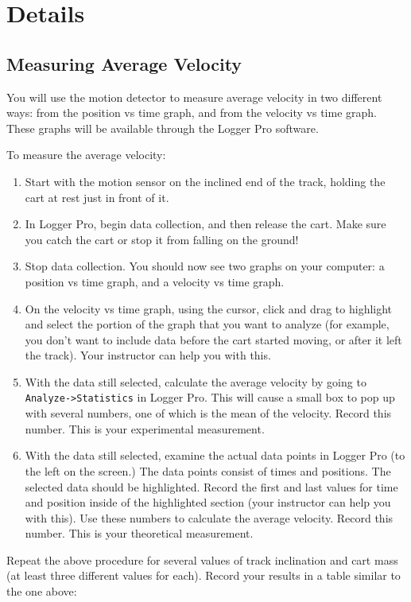 \documentclass{article}
\begin{document}
\section*{Details}
\subsection*{Measuring Average Velocity}
You will use the motion detector to measure average velocity in two different ways: from the position vs time graph, and from the velocity vs time graph. These graphs will be available through the Logger Pro software.

To measure the average velocity:

\begin{enumerate}
	\item Start with the motion sensor on the inclined end of the track, holding the cart at rest just in front of it.
	\item In Logger Pro, begin data collection, and then release the cart. Make sure you catch the cart or stop it from falling on the ground!
	\item Stop data collection. You should now see two graphs on your computer: a position vs time graph, and a velocity vs time graph.
	\item On the velocity vs time graph, using the cursor, click and drag to highlight and select the portion of the graph that you want to analyze (for example, you don't want to include data before the cart started moving, or after it left the track). Your instructor can help you with this.
	\item With the data still selected, calculate the average velocity by going to \texttt{Analyze->Statistics} in Logger Pro. This will cause a small box to pop up with several numbers, one of which is the mean of the velocity. Record this number. This is your experimental measurement.
	\item With the data still selected, examine the actual data points in Logger Pro (to the left on the screen.) The data points consist of times and positions. The selected data should be highlighted. Record the first and last values for time and position inside of the highlighted section (your instructor can help you with this). Use these numbers to calculate the average velocity. Record this number. This is your theoretical measurement.
\end{enumerate}

Repeat the above procedure for several values of track inclination and cart mass (at least three different values for each). Record your results in a table similar to the one above:
\end{document}
